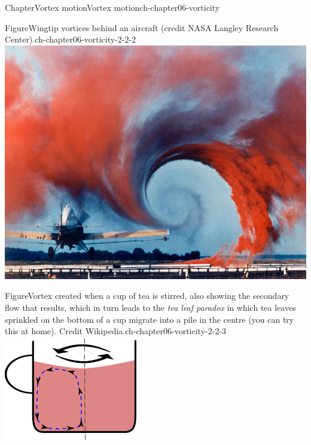 \documentclass[oneside,10pt,]{book}
\numberwithin{equation}{section}
\begin{document}
\begin{chapterptx}{Chapter}{Vortex motion}{}{Vortex motion}{}{}{ch-chapter06-vorticity}
\begin{introduction}{}
\begin{sidebyside}{3}{0}{0}{0}
\begin{sbspanel}{0.333333333333333}
\begin{panelfigureptx}{Figure}{Wingtip vortices behind an aircraft (credit NASA Langley Research Center).}{ch-chapter06-vorticity-2-2-2}{}
\noindent\includegraphics[width=\linewidth]{external/ch-chapter06-NASA-Langley-Research-Center-il_wingtipvortexedit_lg.jpg}
\tcblower
\end{panelfigureptx}%
\end{sbspanel}%
\begin{sbspanel}{0.333333333333333}%
\begin{panelfigureptx}{Figure}{Vortex created when a cup of tea is stirred, also showing the secondary flow that results, which in turn leads to the \emph{tea leaf paradox} in which tea leaves sprinkled on the bottom of a cup migrate into a pile in the centre (you can try this at home). Credit Wikipedia.}{ch-chapter06-vorticity-2-2-3}{}%
\noindent\includegraphics[width=\linewidth]{external/ch-chapter06-220px-Tea_leaf_Paradox_Illustration.png}

\end{panelfigureptx}
\end{sbspanel}
\end{sidebyside}
\end{introduction}
\end{chapterptx}
\end{document}
